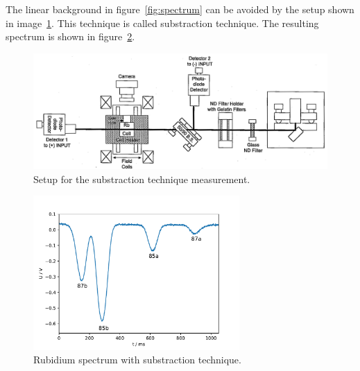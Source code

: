 The linear background in figure~\ref{fig:spectrum} can be avoided by the
setup shown in image~\ref{fig:setup_substraction}.
This technique is called substraction technique.
The resulting spectrum is shown in figure~\ref{fig:spectrum_sub}.

\begin{figure}
  \centering
  \includegraphics[width=\textwidth]{Pics/setup_substraction.png}
  \caption{Setup for the substraction technique measurement.\cite{anleitung}}
  \label{fig:setup_substraction}
\end{figure}


\begin{figure}
  \centering
  \includegraphics[width=0.7\textwidth]{Pics/Rb_spectrum_subst.pdf}
  \caption{Rubidium spectrum with substraction technique.}
  \label{fig:spectrum_sub}
\end{figure}

